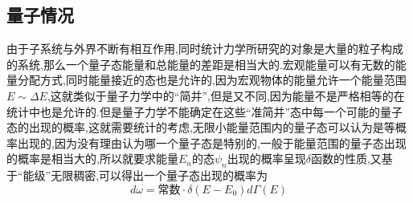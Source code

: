 \subsection{量子情况}

由于子系统与外界不断有相互作用,同时统计力学所研究的对象是大量的粒子构成的系统,那么一个量子态能量和总能量的差距是相当大的.宏观能量可以有无数的能量分配方式,同时能量接近的态也是允许的,因为宏观物体的能量允许一个能量范围$E\sim \Delta E$,这就类似于量子力学中的``简并'',但是又不同,因为能量不是严格相等的在统计中也是允许的.但是量子力学不能确定在这些``准简并''态中每一个可能的量子态的出现的概率,这就需要统计的考虑,无限小能量范围内的量子态可以认为是等概率出现的,因为没有理由认为哪一个量子态是特别的,一般于能量范围的量子态出现的概率是相当大的,所以就要求能量$E_n$的态$\psi_n$出现的概率呈现$\delta$函数的性质,又基于``能级''无限稠密,可以得出一个量子态出现的概率为
\begin{equation}
  d\omega =\mbox{常数}\cdot \delta(E-E_0)d\Gamma(E)
\end{equation}
